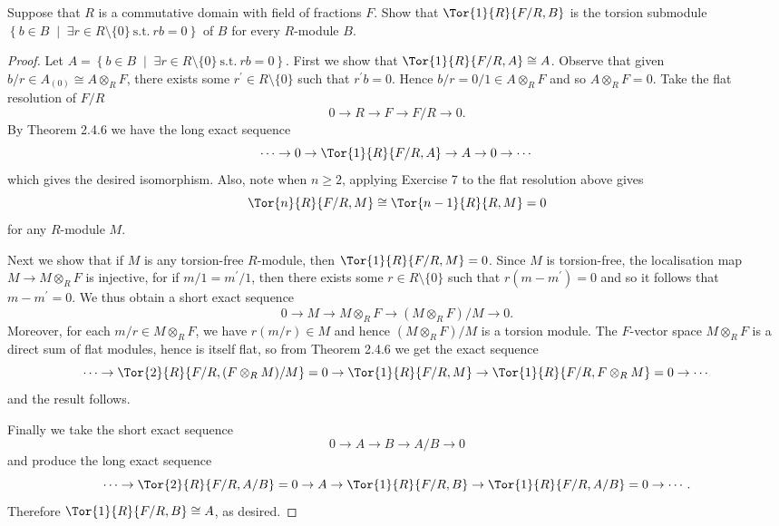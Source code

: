 \documentclass[10pt]{amsart}
\begin{document}
\begin{ex}
  Suppose that $R$ is a commutative domain with field of fractions $F$.
  Show that $\Tor{1}{R}{F/R, B}$ is the torsion submodule $\left\{b \in B \;\middle\vert\; \exists r \in R\setminus\{0\}\ \text{s.t.}\ rb = 0\right\}$ of $B$ for every $R$-module $B$.

  \begin{proof}
    Let $A = \left\{b \in B \;\middle\vert\; \exists r \in R\setminus\{0\}\ \text{s.t.}\ rb = 0\right\}$.
    First we show that $\Tor{1}{R}{F/R, A} \cong A$.
    Observe that given $b/r \in A_{(0)} \cong A \otimes_R F$, there exists some $r^\prime \in R\setminus\{0\}$ such that $r^\prime b = 0$.
    Hence $b/r = 0/1 \in A \otimes_R F$ and so $A \otimes_R F = 0$.
    Take the flat resolution of $F/R$
    $$0 \rightarrow R \rightarrow F \rightarrow F/R \rightarrow 0.$$
    By Theorem 2.4.6 we have the long exact sequence
    $$\cdots \rightarrow 0 \rightarrow \Tor{1}{R}{F/R, A} \rightarrow A \rightarrow 0 \rightarrow \cdots$$
    which gives the desired isomorphism.
    Also, note when $n \geq 2$, applying Exercise 7 to the flat resolution above gives
    $$\Tor{n}{R}{F/R, M} \cong \Tor{n-1}{R}{R,M} = 0$$
    for any $R$-module $M$.
    
    Next we show that if $M$ is any torsion-free $R$-module, then $\Tor{1}{R}{F/R, M} = 0$.
    Since $M$ is torsion-free, the localisation map $M \rightarrow M \otimes_R F$ is injective, for if $m/1 = m^\prime/1$, then there exists some $r \in R\setminus\{0\}$ such that $r(m - m^\prime) = 0$ and so it follows that $m - m^\prime = 0$.
    We thus obtain a short exact sequence
    $$0 \rightarrow M \rightarrow M \otimes_R F \rightarrow (M \otimes_R F)/M \rightarrow 0.$$
    Moreover, for each $m/r \in M \otimes_R F$, we have $r (m/r) \in M$ and hence $(M \otimes_R F)/M$ is a torsion module.
    The $F$-vector space $M \otimes_R F$ is a direct sum of flat modules, hence is itself flat, so from Theorem 2.4.6 we get the exact sequence
    $$\cdots \rightarrow \Tor{2}{R}{F/R, (F \otimes_R M) / M} = 0 \rightarrow \Tor{1}{R}{F/R, M} \rightarrow \Tor{1}{R}{F/R, F \otimes_R M} = 0 \rightarrow \cdots$$
    and the result follows.
    
    Finally we take the short exact sequence
    $$0 \rightarrow A \rightarrow B \rightarrow A/B \rightarrow 0$$
    and produce the long exact sequence
    $$\cdots \rightarrow \Tor{2}{R}{F/R, A/B} = 0 \rightarrow A \rightarrow \Tor{1}{R}{F/R,B} \rightarrow \Tor{1}{R}{F/R, A/B} = 0 \rightarrow \cdots.$$
    Therefore $\Tor{1}{R}{F/R,B} \cong A$, as desired.
  \end{proof}
\end{ex}
\end{document}
